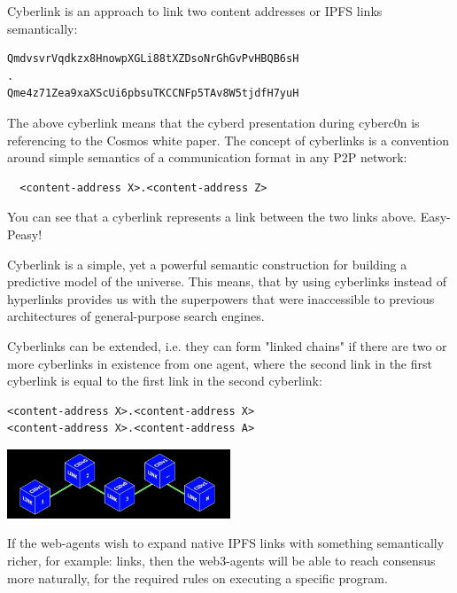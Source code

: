 \documentclass[8pt,oneside]{amsart}
\newcommand{\linkred}[2]{\href{#1}{\color{red}{#2}}}
\newcommand{\code}[1]{{\PlayBold #1}}
\newenvironment{Figure}
  {\par\medskip\noindent\minipage{\linewidth}}
  {\endminipage\par\medskip}
\begin{document}
\begin{Abstract}
\code{Cyberlink} is an approach to link two content addresses or \code{IPFS links} semantically:

\begin{lstlisting}
QmdvsvrVqdkzx8HnowpXGLi88tXZDsoNrGhGvPvHBQB6sH
.
Qme4z71Zea9xaXScUi6pbsuTKCCNFp5TAv8W5tjdfH7yuH
\end{lstlisting}

The above cyberlink means that the cyberd presentation during cyberc0n is referencing to the Cosmos white paper. The concept of cyberlinks is a convention around simple semantics of a communication format in any P2P network:

\begin{lstlisting}
  <content-address X>.<content-address Z>
\end{lstlisting}

You can see that a cyberlink represents a link between the two links above. Easy-Peasy!

Cyberlink is a simple, yet a powerful semantic construction for building a predictive model of the universe. This means, that by using cyberlinks instead of hyperlinks provides us with the superpowers that were inaccessible to previous architectures of general-purpose search engines.

Cyberlinks can be extended, i.e. they can form "linked chains" if there are two or more cyberlinks in existence from one agent, where the second link in the first cyberlink is equal to the first link in the second cyberlink:

\begin{lstlisting}
<content-address X>.<content-address X>
<content-address X>.<content-address A>
\end{lstlisting}

\begin{Figure}
    \centering
    \includegraphics[width=0.5\textwidth]{linkchain.jpg}
\end{Figure}

If the web-agents wish to expand native \code{IPFS links} with something semantically richer, for example:
\linkred{https://github.com/cybercongress/cyb/blob/dev/docs/dura.md}{DURA}
links, then the web3-agents will be able to reach consensus more naturally, for the required rules on executing a specific program.


\end{Abstract}
\end{document}
